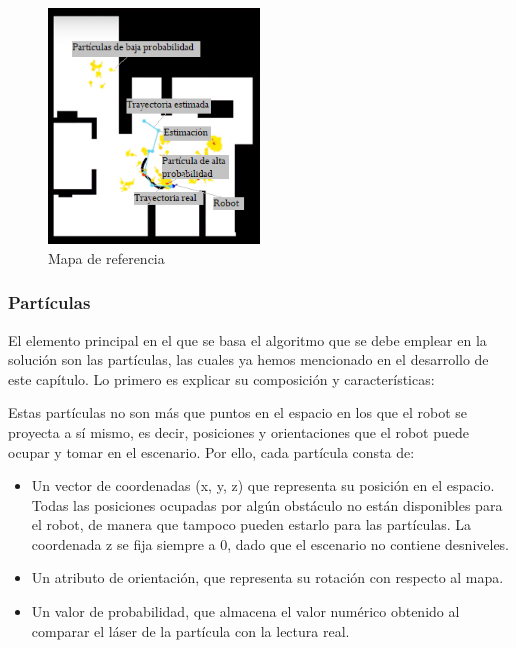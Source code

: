 \begin{figure}[H]
	\begin{center}
		\includegraphics[width=0.5\textwidth]{figures/mapareferencia.png}
		\caption{Mapa de referencia}
		\label{fig.mapareferencia}
		\end{center}
\end{figure}

\subsubsection{Partículas}
El elemento principal en el que se basa el algoritmo que se debe emplear en la solución son las partículas, las cuales ya hemos mencionado en el desarrollo de este capítulo. Lo primero es explicar su composición y características:

Estas partículas no son más que puntos en el espacio en los que el robot se proyecta a sí mismo, es decir, posiciones y orientaciones que el robot puede ocupar y tomar en el escenario. Por ello, cada partícula consta de:

\begin{itemize}
  \renewcommand{\labelitemi}{$\to$}
	\item Un vector de coordenadas (x, y, z) que representa su posición en el espacio. Todas las posiciones ocupadas por algún obstáculo no están disponibles para el robot, de manera que tampoco pueden estarlo para las partículas. La coordenada z se fija siempre a 0, dado que el escenario no contiene desniveles.
	\item Un atributo de orientación, que representa su rotación con respecto al mapa. 
	\item Un valor de probabilidad, que almacena el valor numérico obtenido al comparar el láser de la partícula con la lectura real.
\end{itemize}

